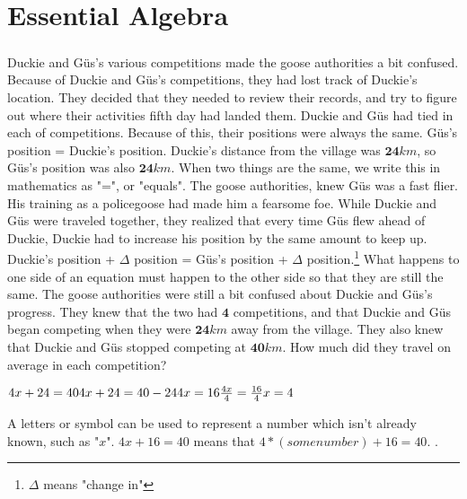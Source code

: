 \chapter{Essential Algebra}
\paragraph{} Duckie and Güs's various competitions made the goose authorities a bit confused. Because of Duckie and Güs's competitions, they had lost track of Duckie's location. They decided that they needed to review their records, and try to figure out where their activities fifth day had landed them. 
\vfill
\pagebreak
{Duckie and Güs had tied in each of competitions. Because of this, their positions were always the same.}
{Güs's position = Duckie's position. Duckie's distance from the village was $\mathbf{24}km$, so Güs's position was also $\mathbf{24}km$.}
{When two things are the same, we write this in mathematics as "=", or "equals".}
{}
{The goose authorities, knew Güs was a fast flier. His training as a policegoose had made him a fearsome foe. While Duckie and Güs were traveled together, they realized that every time Güs flew ahead of Duckie, Duckie had to increase his position by the same amount to keep up.}
{Duckie's position + $\Delta$ position = Güs's position + $\Delta$ position.\footnote{$\Delta$ means "change in"}}
{What happens to one side of an equation must happen to the other side so that they are still the same.}
{}
{The goose authorities were still a bit confused about Duckie and Güs's progress. They knew that the two had $\mathbf{4}$ competitions, and that Duckie and Güs began competing when they were $\mathbf{24} km$ away from the village. They also knew that Duckie and Güs stopped competing at $\mathbf{40} km$. How much did they travel on average in each competition?}
{\begin{center}$4x + 24 = 40 \linebreak 4x + 24 = 40 - 24 \linebreak 4x = 16 \linebreak \frac{4x}{4} = \frac{16}{4} \linebreak x = 4  $\end{center}}
{A letters or symbol can be used to represent a number which isn’t already known, such as "$x$". $4x + 16 = 40$ means that $4\ast(some number) + 16 = 40$.}
{}.